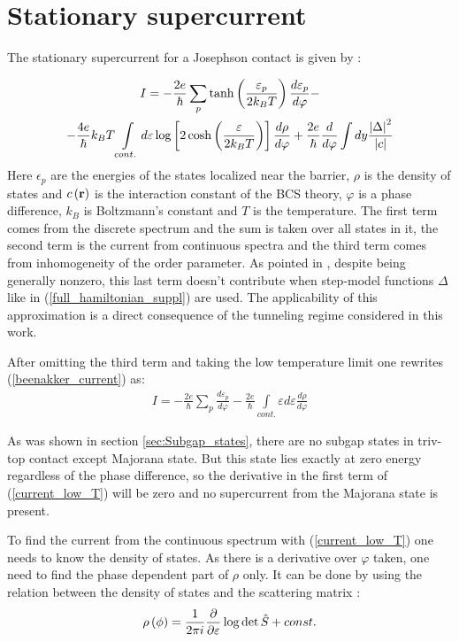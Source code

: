 \section{Stationary supercurrent }

\label{sec:stationary_supercurrent}
The stationary supercurrent for a Josephson contact is given by \cite{Beenakker_three_universal}:

\begin{multline}
\label{beenakker_current}
	I =
	-
	\frac{2e}{\hbar}
	\sum_p
	\tanh\left(\frac{\varepsilon_p}{2k_BT}\right)
	\frac{d \varepsilon_p}{d\varphi}
	-
	\\
	-
	\frac{4e}{\hbar}
k_BT
	\int\limits_{cont.}d\varepsilon \log
	\left[
		2\cosh\left(\frac{\varepsilon}{2k_BT}\right)
	\right]
	\frac{d\rho}{d\varphi}
	+
	\frac{2e}{\hbar}
	\frac{d}{d\varphi}
	\int
	d y
		\frac{\left|\Delta\right|^2}{\left| c\right|}
\end{multline}
Here $ \epsilon_p $ are the energies of the states localized near the barrier, $ \rho$ is the density of states and $ c\left(\textbf{r}\right) $ is the interaction constant of the BCS theory, $ \varphi $ is a phase difference, $ k_B $ is Boltzmann's constant and $ T $ is the temperature.
The first term comes from the discrete spectrum and the sum is taken over all states in it, the second term is the current from continuous spectra and the third  term comes from inhomogeneity of the order parameter. As pointed in \cite{Beenakker_three_universal}, despite being generally nonzero, this last term doesn't contribute when step-model functions $ \Delta $ like in (\ref{full_hamiltonian_suppl})  are used. The applicability of this approximation is a direct consequence of the tunneling regime considered in this work.

After omitting the third term and taking the low temperature limit one rewrites (\ref{beenakker_current}) as:
\begin{gather}
\label{current_low_T}
		I =
		-
	\frac{2e}{\hbar}
	\sum_p
	\frac{d \varepsilon_p}{d\varphi}
	-
	\frac{2e}{\hbar}
	\int\limits_{cont.}\varepsilon d\varepsilon 
	\frac{d\rho}{d\varphi}
\end{gather}

As was shown in section \ref{sec:Subgap_states}, there are no subgap states in triv-top contact except Majorana state. But this state lies exactly at zero energy regardless of the phase difference, so the derivative in the first term of (\ref{current_low_T}) will be zero and no supercurrent from the Majorana state is present. 

To find the current from the continuous spectrum with (\ref{current_low_T}) one needs to know the density of states. As there is a derivative over $ \varphi $ taken, one need to find the phase dependent part of $\rho  $ only. It can be done by using the relation between the density of states and the scattering matrix \cite{Akkermans_Avron_Shapiro_scattering_matrix}:
\begin{gather}
\label{smatrix_and_DOS}
	\rho\left(\phi\right)=\frac{1}{2\pi i}\frac{\partial}{\partial \varepsilon}\log \det \hat{S} +const.
\end{gather}

